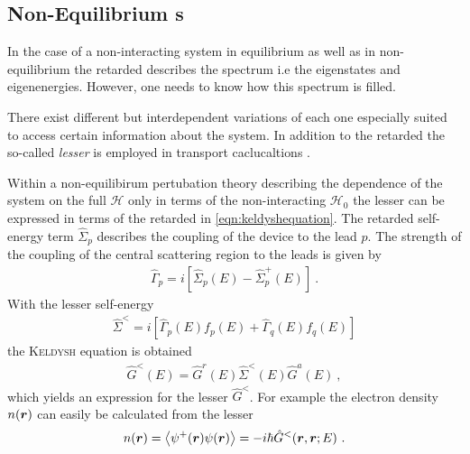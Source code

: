 \subsection{Non-Equilibrium \cgfnc s}
In the case of a non-interacting system in equilibrium as well as in non-equilibrium the retarded \gfnc{} describes the spectrum i.e the eigenstates and eigenenergies. However, one needs to know how this spectrum is filled.\par 
There exist different but interdependent variations of \gfnc{} each one especially suited to access certain information about the system.
In addition to the retarded \gfnc{} the so-called \emph{lesser \gfnc{}} is employed in transport caclucaltions \cite{haug2008quantum}.\par
Within a non-equilibirum pertubation theory describing the dependence of the system on the full \hamil{} $\mathcal{H}$ only in terms of the non-interacting \hamil{} $\mathcal{H}_0$ \cite{Jauho2006} the lesser \gfnc{} can be expressed in terms of the retarded \gfnc{} in \cref{eqn:keldyshequation}. The retarded self-energy term $\hat{\Sigma}_p$ describes the coupling of the device to the lead $p$. The strength of the coupling of the central scattering region to the leads is given by \cite{datta2005quantum}
\begin{align}
\hat{\Gamma}_p = i\left[\hat{\Sigma}_p(E)-\hat{\Sigma}_p^+(E)\right]\ .
\end{align}
With the lesser self-energy
\begin{align}
\hat{\Sigma}^<=i\left[\hat{\Gamma}_p(E)f_p(E)+\hat{\Gamma}_q(E)f_q(E) \right]
\end{align}
the \textsc{Keldysh} equation is obtained
\begin{align}
\hat{G}^<(E) = \hat{G}^r(E) \hat{\Sigma}^<(E) \hat{G}^a(E)\ ,
\label{eqn:keldyshequation}
\end{align}
which yields an expression for the lesser \gfnc{} $\hat{G}^<$.
For example the electron density  $n(\boldsymbol{r})$ can easily be calculated from the lesser \gfnc{}
\begin{align}
	n(\boldsymbol{r}) = \left< \psi^+ (\boldsymbol{r}) \psi(\boldsymbol{r})\right> = -i\hbar \hat{G}^<(\boldsymbol{r},\boldsymbol{r};E)\ .
	\label{eqn:edensfromgreensfnc}
\end{align}

